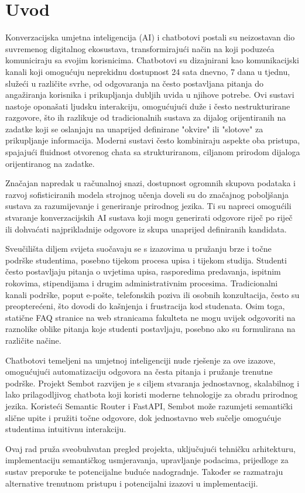 \section{Uvod}

Konverzacijska umjetna inteligencija (AI) i chatbotovi postali su neizostavan dio suvremenog digitalnog ekosustava, transformirajući način na koji poduzeća komuniciraju sa svojim korisnicima. Chatbotovi su dizajnirani kao komunikacijski kanali koji omogućuju neprekidnu dostupnost 24 sata dnevno, 7 dana u tjednu, služeći u različite svrhe, od odgovaranja na često postavljana pitanja do angažiranja korisnika i prikupljanja dubljih uvida u njihove potrebe. Ovi sustavi nastoje oponašati ljudsku interakciju, omogućujući duže i često nestrukturirane razgovore, što ih razlikuje od tradicionalnih sustava za dijalog orijentiranih na zadatke koji se oslanjaju na unaprijed definirane "okvire" ili "slotove" za prikupljanje informacija. Moderni sustavi često kombiniraju aspekte oba pristupa, spajajući fluidnost otvorenog chata sa strukturiranom, ciljanom prirodom dijaloga orijentiranog na zadatke.

Značajan napredak u računalnoj snazi, dostupnost ogromnih skupova podataka i razvoj sofisticiranih modela strojnog učenja doveli su do značajnog poboljšanja sustava za razumijevanje i generiranje prirodnog jezika. Ti su napreci omogućili stvaranje konverzacijskih AI sustava koji mogu generirati odgovore riječ po riječ ili dohvaćati najprikladnije odgovore iz skupa unaprijed definiranih kandidata.

Sveučilišta diljem svijeta suočavaju se s izazovima u pružanju brze i točne podrške studentima, posebno tijekom procesa upisa i tijekom studija. Studenti često postavljaju pitanja o uvjetima upisa, rasporedima predavanja, ispitnim rokovima, stipendijama i drugim administrativnim procesima. Tradicionalni kanali podrške, poput e-pošte, telefonskih poziva ili osobnih konzultacija, često su preopterećeni, što dovodi do kašnjenja i frustracija kod studenata. Osim toga, statične FAQ stranice na web stranicama fakulteta ne mogu uvijek odgovoriti na raznolike oblike pitanja koje studenti postavljaju, posebno ako su formulirana na različite načine.

Chatbotovi temeljeni na umjetnoj inteligenciji nude rješenje za ove izazove, omogućujući automatizaciju odgovora na česta pitanja i pružanje trenutne podrške. Projekt Sembot razvijen je s ciljem stvaranja jednostavnog, skalabilnog i lako prilagodljivog chatbota koji koristi moderne tehnologije za obradu prirodnog jezika. Koristeći Semantic Router i FastAPI, Sembot može razumjeti semantički slične upite i pružiti točne odgovore, dok jednostavno web sučelje omogućuje studentima intuitivnu interakciju.

Ovaj rad pruža sveobuhvatan pregled projekta, uključujući tehničku arhitekturu, implementaciju semantičkog usmjeravanja, upravljanje podacima, prijedloge za sustav preporuke te potencijalne buduće nadogradnje. Također se razmatraju alternative trenutnom pristupu i potencijalni izazovi u implementaciji.